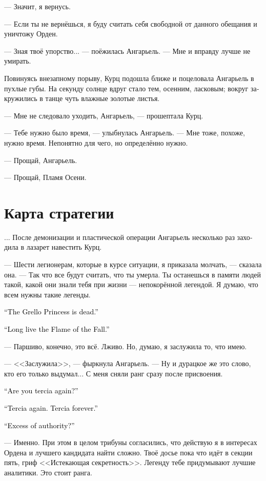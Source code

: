 \documentclass[a4paper,12pt,fleqn]{book}\usepackage{cooltooltips}\usepackage{polyglossia}\setdefaultlanguage[babelshorthands=true]{russian}\setotherlanguage{english}\defaultfontfeatures{Ligatures=TeX,Mapping=tex-text} \usepackage{xcolor}\definecolor{lightgray}{HTML}{bbbbbb}\color{lightgray}\newcommand{\ml}[3]{\textenglish{\textcolor{black}{#3}}}
\begin{document}
--- Значит, я вернусь.

--- Если ты не вернёшься, я буду считать себя свободной от данного обещания и уничтожу Орден.

--- Зная твоё упорство... --- поёжилась Ангарьель.
--- Мне и вправду лучше не умирать.

Повинуясь внезапному порыву, Курц подошла ближе и поцеловала Ангарьель в пухлые губы.
На секунду солнце вдруг стало тем, осенним, ласковым;
вокруг закружились в танце чуть влажные золотые листья.

--- Мне не следовало уходить, Ангарьель, --- прошептала Курц.

--- Тебе нужно было время, --- улыбнулась Ангарьель.
--- Мне тоже, похоже, нужно время.
Непонятно для чего, но определённо нужно.

--- Прощай, Ангарьель.

--- Прощай, Пламя Осени.

\section{Карта стратегии}

... После демонизации и пластической операции Ангарьель несколько раз заходила в лазарет навестить Курц.

--- Шести легионерам, которые в курсе ситуации, я приказала молчать, --- сказала она.
--- Так что все будут считать, что ты умерла.
Ты останешься в памяти людей такой, какой они знали тебя при жизни --- непокорённой легендой.
Я думаю, что всем нужны такие легенды.

\ml{$0$}
{--- Принцесса греллов мертва.}
{``The Grello Princess is dead.''}

\ml{$0$}
{--- Да здравствует Пламя Осени.}
{``Long live the Flame of the Fall.''}

--- Паршиво, конечно, это всё.
Лживо.
Но, думаю, я заслужила то, что имею.

--- <<Заслужила>>, --- фыркнула Ангарьель.
--- Ну и дурацкое же это слово, кто его только выдумал...
С меня сняли ранг сразу после присвоения.

\ml{$0$}
{--- Ты снова терция?}
{``Are you tercia again?''}

\ml{$0$}
{--- Снова терция.}
{``Tercia again.}
\ml{$0$}
{Вечная терция.}
{Tercia forever.''}

\ml{$0$}
{--- За самоуправство?}
{``Excess of authority?''}

--- Именно.
При этом в целом трибуны согласились, что действую я в интересах Ордена и лучшего кандидата найти сложно.
Твоё досье пока что идёт в секции пять, гриф <<Истекающая секретность>>.
Легенду тебе придумывают лучшие аналитики.
Это стоит ранга.
\end{document}
